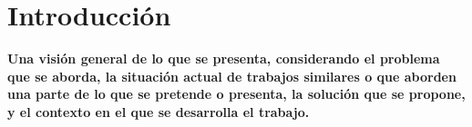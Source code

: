 \section{Introducción}\label{sc:Intro}

\textbf{Una visión general de lo que se presenta, considerando el problema que se aborda, la situación actual de trabajos similares o que aborden una parte de lo que se pretende o presenta, la solución que se propone, y el contexto en el que se desarrolla el trabajo.}
